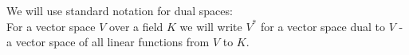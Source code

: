 \documentclass[a4paper, 12pt]{article}
\begin{document}
We will use standard notation for dual spaces: \\
For a vector space $V$ over a field $K$ we will write $V^*$ for a vector space dual to $V$ -
a vector space of all linear functions from $V$ to $K$.
\end{document}
